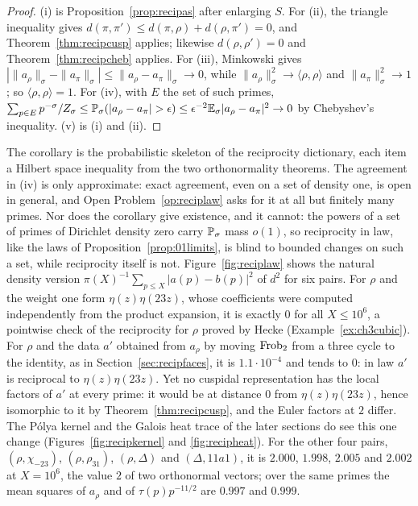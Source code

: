 \begin{proof}
(i) is Proposition~\ref{prop:recipas} after enlarging $S$. For (ii), the triangle inequality gives $d(\pi,\pi')\le d(\pi,\rho)+d(\rho,\pi')=0$, and Theorem~\ref{thm:recipcusp} applies; likewise $d(\rho,\rho')=0$ and Theorem~\ref{thm:recipcheb} applies. For (iii), Minkowski gives $|\|a_\rho\|_\sigma-\|a_\pi\|_\sigma|\le\|a_\rho-a_\pi\|_\sigma\to0$, while $\|a_\rho\|_\sigma^2\to\langle\rho,\rho\rangle$ and $\|a_\pi\|_\sigma^2\to1$; so $\langle\rho,\rho\rangle=1$. For (iv), with $E$ the set of such primes, $\sum_{p\in E}p^{-\sigma}/Z_\sigma\le\Prob_\sigma(|a_\rho-a_\pi|>\epsilon)\le\epsilon^{-2}\E_\sigma|a_\rho-a_\pi|^2\to0$ by Chebyshev's inequality. (v) is (i) and (ii).
\end{proof}

The corollary is the probabilistic skeleton of the reciprocity dictionary, each item a Hilbert space inequality from the two orthonormality theorems. The agreement in (iv) is only approximate: exact agreement, even on a set of density one, is open in general, and Open Problem~\ref{op:reciplaw} asks for it at all but finitely many primes. Nor does the corollary give existence, and it cannot: the powers of a set of primes of Dirichlet density zero carry $\mathbb{P}_\sigma$ mass $o(1)$, so reciprocity in law, like the laws of Proposition~\ref{prop:01limits}, is blind to bounded changes on such a set, while reciprocity itself is not. Figure~\ref{fig:reciplaw} shows the natural density version $\pi(X)^{-1}\sum_{p\le X}|a(p)-b(p)|^2$ of $d^2$ for six pairs. For $\rho$ and the weight one form $\eta(z)\eta(23z)$, whose coefficients were computed independently from the product expansion, it is exactly $0$ for all $X\le10^6$, a pointwise check of the reciprocity for $\rho$ proved by Hecke (Example~\ref{ex:ch3cubic}). For $\rho$ and the data $a'$ obtained from $a_\rho$ by moving $\operatorname{Frob}_2$ from a three cycle to the identity, as in Section~\ref{sec:recipfaces}, it is $1.1\cdot10^{-4}$ and tends to $0$: in law $a'$ is reciprocal to $\eta(z)\eta(23z)$. Yet no cuspidal representation has the local factors of $a'$ at every prime: it would be at distance $0$ from $\eta(z)\eta(23z)$, hence isomorphic to it by Theorem~\ref{thm:recipcusp}, and the Euler factors at $2$ differ. The P\'olya kernel and the Galois heat trace of the later sections do see this one change (Figures~\ref{fig:recipkernel} and \ref{fig:recipheat}). For the other four pairs, $(\rho,\chi_{-23})$, $(\rho,\rho_{31})$, $(\rho,\Delta)$ and $(\Delta,11a1)$, it is $2.000$, $1.998$, $2.005$ and $2.002$ at $X=10^6$, the value $2$ of two orthonormal vectors; over the same primes the mean squares of $a_\rho$ and of $\tau(p)p^{-11/2}$ are $0.997$ and $0.999$.

